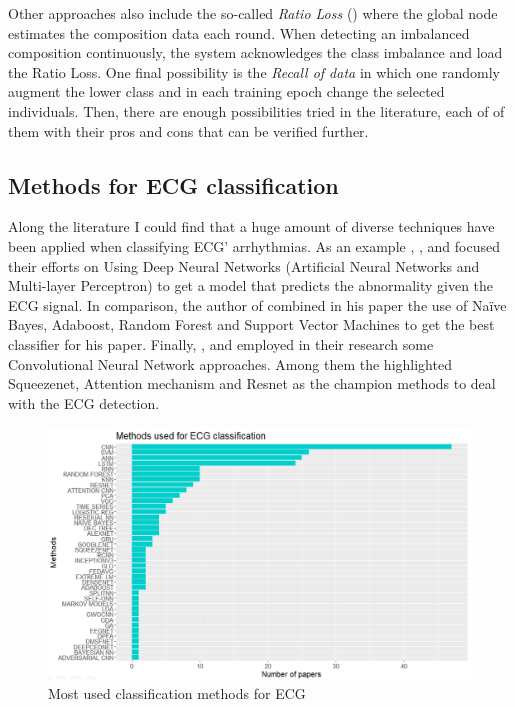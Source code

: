 Other approaches also include the so-called \textit{Ratio Loss} (\cite{imbalance_data4}) where the global node estimates the composition data each round. When detecting an imbalanced composition continuously, the system acknowledges the class imbalance and load the Ratio Loss. One final possibility is the \textit{Recall of data} in which one randomly augment the lower class and in each training epoch change the selected individuals. Then, there are enough possibilities tried in the literature, each of of them with their pros and cons that can be verified further.


\subsection{Methods for ECG classification} \label{methods_ECG_class}

Along the literature I could find that a huge amount of diverse techniques have been applied when classifying ECG' arrhythmias. As an example \cite{ecg_methods1}, \cite{ecg_methods2}, and \cite{ecg_methods3} focused their efforts on Using Deep Neural Networks (Artificial Neural Networks and Multi-layer Perceptron) to get a model that predicts the abnormality given the ECG signal. In comparison, the author of \cite{ecg_methods4} combined in his paper the use of Naïve Bayes, Adaboost, Random Forest and Support Vector Machines to get the best classifier for his paper. Finally, \cite{ecg_methods5}, \cite{ecg_methods6} and \cite{ecg_methods7} employed in their research some Convolutional Neural Network approaches. Among them the highlighted Squeezenet, Attention mechanism and Resnet as the champion methods to deal with the ECG detection.

 \begin{figure}[H]
\centering
\includegraphics[scale=0.48]{img/classif_methods.PNG}
\caption{Most used classification methods for ECG}
\label{fig:classif_methods}
\end{figure}

